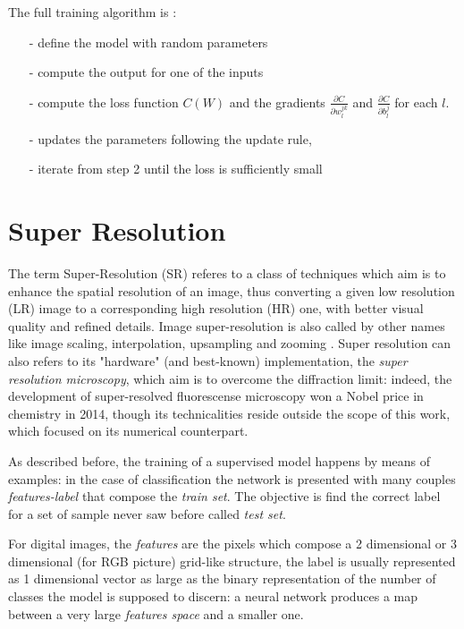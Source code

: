 \documentclass[12pt,a4paper]{report}
\begin{document}
The full training algorithm is : 

\begin{itemize}
 \setlength\itemsep{-0.3em}
 \item [-] define the model with random parameters
 \item [-] compute the output for one of the inputs
 \item [-] compute the loss function $C(W)$ and the gradients $\frac{\partial C}{\partial w_l^{j k}}$ and $\frac{\partial C}{\partial b_l^j}$ for each $l$.
 \item [-] updates the parameters following the update rule, 
 \item [-] iterate from step 2 until the loss is sufficiently small
\end{itemize}

\section{Super Resolution}

The term Super-Resolution (SR) referes to a class of techniques which aim is to enhance the spatial resolution of an image, thus converting a given low resolution (LR) image to a corresponding high resolution (HR) one, with better visual quality and refined details.
Image super-resolution is also called by other names like image scaling, interpolation, upsampling and zooming \cite{survey-sr}.
Super resolution can also refers to its "hardware" (and best-known) implementation, the {\it super resolution microscopy}, which aim is to overcome the diffraction limit: indeed, the development of super-resolved fluorescense microscopy won a Nobel price in chemistry in 2014, though its technicalities reside outside the scope of this work, which focused on its numerical counterpart.

As described before, the training of a supervised model happens by means of examples: in the case of classification the network is presented with many couples {\it features-label} that compose the {\it train set}. The objective is find the correct label for a set of sample never saw before called {\it test set}.

For digital images, the {\it features} are the pixels which compose a 2 dimensional or 3 dimensional (for RGB picture) grid-like structure, the label is usually represented as 1 dimensional vector as large as the binary representation of the number of classes the model is supposed to  discern: a neural network produces a map between a very large {\it features space} and a smaller one.
\end{document}
